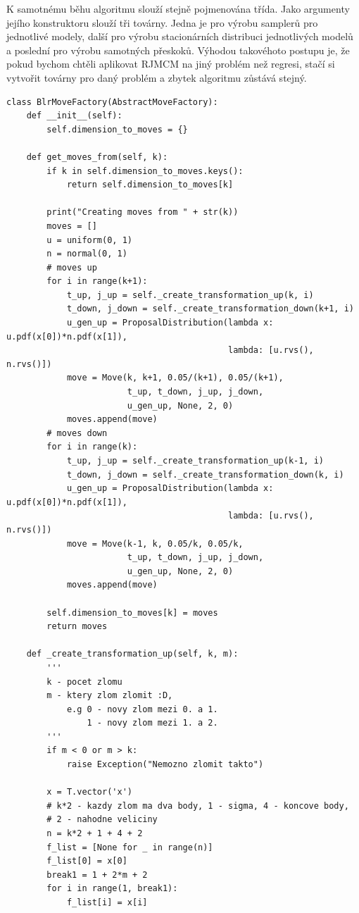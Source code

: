 \documentclass[czech,master,public,dept470,male,cpdeclaration,oneside, python]{diploma}
\begin{document}
K samotnému běhu algoritmu slouží stejně pojmenována třída. Jako argumenty jejího konstruktoru slouží tři továrny. Jedna je pro výrobu samplerů pro jednotlivé modely, další pro výrobu stacionárních distribuci jednotlivých modelů a poslední pro výrobu samotných přeskoků. Výhodou takovéhoto postupu je, že pokud bychom chtěli aplikovat RJMCM na jiný problém než regresi, stačí si vytvořit továrny pro daný problém a zbytek algoritmu zůstává stejný. 

\begin{lstlisting}[caption=BlrMoveFactory]
class BlrMoveFactory(AbstractMoveFactory):
    def __init__(self):
        self.dimension_to_moves = {}

    def get_moves_from(self, k):
        if k in self.dimension_to_moves.keys():
            return self.dimension_to_moves[k]

        print("Creating moves from " + str(k))
        moves = []
        u = uniform(0, 1)
        n = normal(0, 1)
        # moves up
        for i in range(k+1):
            t_up, j_up = self._create_transformation_up(k, i)
            t_down, j_down = self._create_transformation_down(k+1, i)
            u_gen_up = ProposalDistribution(lambda x: u.pdf(x[0])*n.pdf(x[1]),
                                            lambda: [u.rvs(), n.rvs()])
            move = Move(k, k+1, 0.05/(k+1), 0.05/(k+1),
                        t_up, t_down, j_up, j_down,
                        u_gen_up, None, 2, 0)
            moves.append(move)
        # moves down
        for i in range(k):
            t_up, j_up = self._create_transformation_up(k-1, i)
            t_down, j_down = self._create_transformation_down(k, i)
            u_gen_up = ProposalDistribution(lambda x: u.pdf(x[0])*n.pdf(x[1]),
                                            lambda: [u.rvs(), n.rvs()])
            move = Move(k-1, k, 0.05/k, 0.05/k,
                        t_up, t_down, j_up, j_down,
                        u_gen_up, None, 2, 0)
            moves.append(move)

        self.dimension_to_moves[k] = moves
        return moves

    def _create_transformation_up(self, k, m):
        '''
        k - pocet zlomu
        m - ktery zlom zlomit :D,
            e.g 0 - novy zlom mezi 0. a 1.
                1 - novy zlom mezi 1. a 2.
        '''
        if m < 0 or m > k:
            raise Exception("Nemozno zlomit takto")

        x = T.vector('x')
        # k*2 - kazdy zlom ma dva body, 1 - sigma, 4 - koncove body,
        # 2 - nahodne veliciny
        n = k*2 + 1 + 4 + 2
        f_list = [None for _ in range(n)]
        f_list[0] = x[0]
        break1 = 1 + 2*m + 2
        for i in range(1, break1):
            f_list[i] = x[i]


\end{lstlisting}
\end{document}
